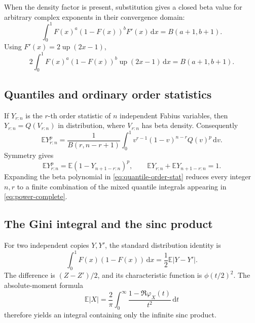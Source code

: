 \documentclass[11pt,oneside]{article}
\theoremstyle{definition}
\newcommand{\F}{F}
\newcommand{\Q}{Q}
\newcommand{\upf}{\operatorname{up}}
\newcommand{\E}{\mathbb E}
\newcommand{\dd}{\,\mathrm d}
\begin{document}
When the density factor is present, substitution gives a closed beta value for arbitrary
complex exponents in their convergence domain:
\begin{equation}\label{eq:density-beta}
 \int_0^1\F(x)^a(1-\F(x))^b\F'(x)\dd x
 =B(a+1,b+1).
\end{equation}
Using \(\F'(x)=2\upf(2x-1)\),
\begin{equation}\label{eq:up-density-beta}
 2\int_0^1\F(x)^a(1-\F(x))^b\upf(2x-1)\dd x
 =B(a+1,b+1).
\end{equation}

\subsection{Quantiles and ordinary order statistics}

If \(Y_{r:n}\) is the \(r\)-th order statistic of \(n\) independent Fabius variables,
then \(Y_{r:n}=\Q(V_{r:n})\) in distribution, where \(V_{r:n}\) has beta density.
Consequently
\begin{equation}\label{eq:quantile-order-stat}
 \E Y_{r:n}^p
 =\frac1{B(r,n-r+1)}
 \int_0^1v^{r-1}(1-v)^{n-r}\Q(v)^p\dd v.
\end{equation}
Symmetry gives
\begin{equation}\label{eq:order-stat-symmetry}
 \E Y_{r:n}^p
 =\E(1-Y_{n+1-r:n})^p,
 \qquad
 \E Y_{r:n}+\E Y_{n+1-r:n}=1.
\end{equation}
Expanding the beta polynomial in \cref{eq:quantile-order-stat} reduces every integer
\(n,r\) to a finite combination of the mixed quantile integrals appearing in
\cref{eq:power-complete}.

\subsection{The Gini integral and the sinc product}

For two independent copies \(Y,Y'\), the standard distribution identity is
\begin{equation}\label{eq:Gini-prob}
 \int_0^1\F(x)(1-\F(x))\dd x
 =\frac12\E|Y-Y'|.
\end{equation}
The difference is \((Z-Z')/2\), and its characteristic function is
\(\phi(t/2)^2\).  The absolute-moment formula
\begin{equation}\label{eq:absolute-char}
 \E|X|=\frac2\pi\int_0^\infty
 \frac{1-\Re\varphi_X(t)}{t^2}\dd t
\end{equation}
therefore yields an integral containing only the infinite sinc product.
\end{document}
